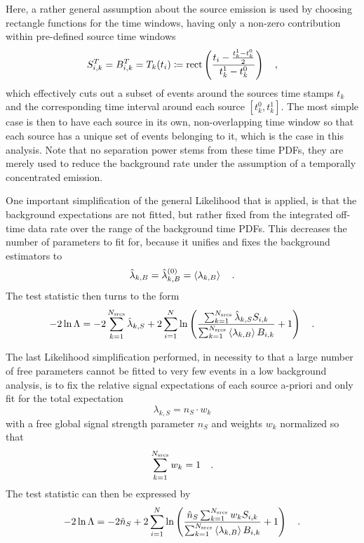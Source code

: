 Here, a rather general assumption about the source emission is used by choosing rectangle functions for the time windows, having only a non-zero contribution within pre-defined source time windows
\begin{equation}
  S_{i,k}^T = B_{i,k}^T = T_k(t_i) \coloneqq
    \operatorname{rect}\left(\frac{t_i - \frac{t_k^1-t_k^0}{2}}
                              {t_k^1-t_k^0}\right)
  \quad\text{,}
\end{equation}
which effectively cuts out a subset of events around the sources time stamps $t_k$ and the corresponding time interval around each source $[t_k^0, t_k^1]$.
The most simple case is then to have each source in its own, non-overlapping time window so that each source has a unique set of events belonging to it, which is the case in this analysis.
Note that no separation power stems from these time PDFs, they are merely used to reduce the background rate under the assumption of a temporally concentrated emission.

One important simplification of the general Likelihood that is applied, is that the background expectations are not fitted, but rather fixed from the integrated off-time data rate over the range of the background time PDFs.
This decreases the number of parameters to fit for, because it unifies and fixes the background estimators to
\begin{equation}
  \hat{\lambda}_{k,B} = \hat{\lambda}_{k,B}^{(0)} = \Braket{\lambda_{k,B}}
  \quad\text{.}
\end{equation}
The test statistic then turns to the form
\begin{equation}
  -2\ln\Lambda
  = -2\sum_{k=1}^{N_\text{srcs}}\hat{\lambda}_{k,S} +
      2\sum_{i=1}^N \ln\left(
        \frac{\sum_{k=1}^{N_\text{srcs}}\hat{\lambda}_{k,S} S_{i,k}}
             {\sum_{k=1}^{N_\text{srcs}}\Braket{\lambda_{k,B}} B_{i,k}}
        + 1
      \right)
  \quad\text{.}
\end{equation}

The last Likelihood simplification performed, in necessity to that a large number of free parameters cannot be fitted to very few events in a low background analysis, is to fix the relative signal expectations of each source a-priori and only fit for the total expectation
\begin{equation}
  \lambda_{k,S} = n_S \cdot w_k
\end{equation}
with a free global signal strength parameter $n_S$ and weights $w_k$ normalized so that
\begin{equation}
  \sum_{k=1}^{N_\text{srcs}} w_k = 1
  \quad\text{.}
\end{equation}
The test statistic can then be expressed by
\begin{equation}
  -2\ln\Lambda
  = -2\hat{n}_S +
      2\sum_{i=1}^N \ln\left(
        \frac{\hat{n}_S \sum_{k=1}^{N_\text{srcs}} w_k S_{i,k}}
             {\sum_{k=1}^{N_\text{srcs}}\Braket{\lambda_{k,B}} B_{i,k}}
        + 1
      \right)
  \quad\text{.}
\end{equation}


